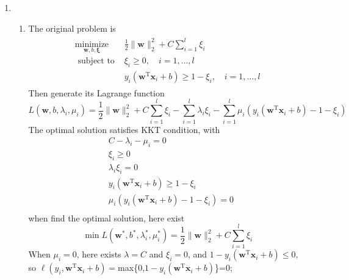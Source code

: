 \documentclass[a4paper]{article}
\begin{document}
\begin{enumerate}
\item 
\begin{enumerate}
  \item The original problem is
  \begin{equation*}
    \begin{aligned}
    \begin{array}{cl}{\underset{\boldsymbol{w}, b, \boldsymbol{\xi}}{\operatorname{minimize}}} & {\frac{1}{2}\|\boldsymbol{w}\|_{2}^{2}+C \sum_{i=1}^{l} \xi_{i}} \\ 
    {\text { subject to }} & {\xi_{i} \geq 0, \quad i=1, \ldots, l} \\
    {} & {y_{i}\left(\boldsymbol{w}^{\mathrm{T}} \boldsymbol{x}_{i}+b\right) \geq 1-\xi_{i}, \quad i=1, \ldots, l}\end{array}
    \end{aligned}
  \end{equation*}
  Then generate its Lagrange function
  \begin{equation*}
    L(\boldsymbol{w}, b, \lambda_i, \mu_i)=\frac{1}{2}\|\boldsymbol{w}\|_{2}^{2}+C \sum_{i=1}^{l} \xi_{i} - \sum_{i=1}^{l}\lambda_i\xi_i - \sum_{i=1}^{l}\mu_i(y_{i}\left(\boldsymbol{w}^{\mathrm{T}} \boldsymbol{x}_{i}+b\right) - 1-\xi_{i})
  \end{equation*}
  The optimal solution satisfies KKT condition, with
  \begin{equation*}
    \begin{aligned}
      &C -\lambda_i -\mu_i = 0\\
      &\xi_{i} \geq 0\\
      &\lambda_i \xi_{i} = 0\\
      &y_{i}\left(\boldsymbol{w}^{\mathrm{T}} \boldsymbol{x}_{i}+b\right) \geq 1-\xi_{i}\\
      &\mu_i(y_{i}\left(\boldsymbol{w}^{\mathrm{T}} \boldsymbol{x}_{i}+b\right) - 1-\xi_{i}) = 0\\
    \end{aligned}
  \end{equation*}
  when find the optimal solution, here exist
  \begin{equation*}
    \min L(\boldsymbol{w}^*, b^*, \lambda_i^*, \mu_i^*)=\frac{1}{2}\|\boldsymbol{w}\|_{2}^{2} + C \sum_{i=1}^{l} \xi_{i}
  \end{equation*}
  When $\mu_i=0$, here exists $\lambda=C$ and $\xi_{i}=0$, and $1- y_{i}\left(\boldsymbol{w}^{\mathrm{T}} \boldsymbol{x}_{i}+b\right) \leq 0$,\\
  so $\ell\left(y_{i}, \boldsymbol{w}^{\mathrm{T}} \boldsymbol{x}_{i}+b\right)=$max\{0,$1- y_{i}\left(\boldsymbol{w}^{\mathrm{T}} \boldsymbol{x}_{i}+b\right)$\}=0;\\

\end{enumerate}
\end{enumerate}
\end{document}
